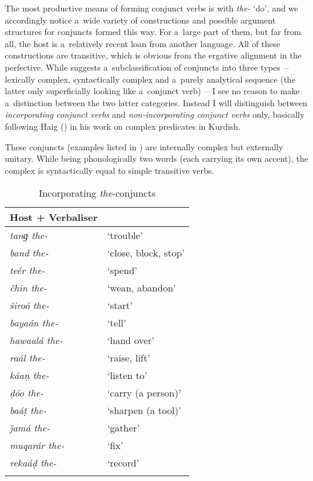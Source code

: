 The most productive means of forming conjunct verbs is with \textit{the-} `do', and we accordingly notice a~wide variety of constructions and possible argument structures for conjuncts formed this way. For a~large part of them, but far from all, the host is a~relatively recent loan from another language. All of these constructions are transitive, which is obvious from the ergative alignment in the perfective. While \citet[201]{verma1993} suggests a~subclassification of conjuncts into three types~-- lexically complex, syntactically complex and a~purely analytical sequence (the latter only superficially looking like a~conjunct verb)~-- I see no reason to make a~distinction between the two latter categories. Instead I will distinguish between \textit{incorporating conjunct verbs} and \textit{non-incorporating conjunct verbs} only, basically following Haig (\citeyear{haig2002}) in his work on complex predicates in Kurdish.


 These conjuncts (examples listed in ) are internally complex but externally unitary. While being phonologically two words (each carrying its own accent), the complex is syntactically equal to simple transitive verbs.


\begin{table}[ht]
\caption{Incorporating \textit{the}-conjuncts}
\begin{tabularx}{.75\textwidth}{ l@{\hspace{45pt}} Q }
\lsptoprule
Host + Verbaliser &
\\\hline
\textit{tanɡ the-} &
`trouble'\\
\textit{band the-} &
`close, block, stop'\\
\textit{teér the-} &
`spend'\\
\textit{čhin the-} &
`wean, abandon'\\
\textit{široó the-} &
`start'\\
\textit{bayaán the-} &
`tell'\\
\textit{hawaalá the-} &
`hand over'\\
\textit{raál the-} &
`raise, lift'\\
\textit{káaṇ the-} &
`listen to'\\
\textit{ḍóo the-} &
`carry (a person)'\\
\textit{baáṭ the-} &
`sharpen (a tool)'\\
\textit{ǰamá the-} &
`gather'\\
\textit{muqarár the-} &
`fix'\\
\textit{rekaáḍ the-} &
`record'\\\lspbottomrule
\end{tabularx}
\label{tab:12-3}
\end{table}


